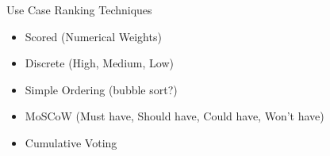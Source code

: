 \documentclass[10pt,t,a4paper]{beamer}
\begin{document}
\begin{frame}[label=sec-1-23]{Use Case Ranking Techniques}
\begin{itemize}
\item Scored (Numerical Weights)
\item Discrete (High, Medium, Low)
\item Simple Ordering (bubble sort?)
\item MoSCoW (Must have, Should have, Could have, Won't have)
\item Cumulative Voting
\end{itemize}
\end{frame}
\end{document}
